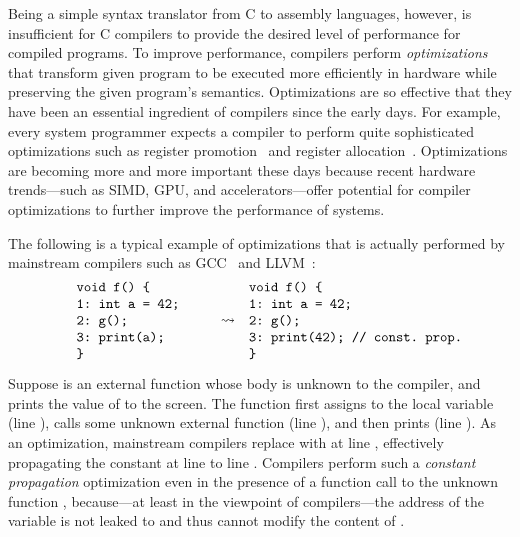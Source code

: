 

Being a simple syntax translator from C to assembly languages, however, is insufficient for C
compilers to provide the desired level of performance for compiled programs.  To improve
performance, compilers perform \emph{optimizations} that transform given program to be executed more
efficiently in hardware while preserving the given program's semantics.  Optimizations are so
effective that they have been an essential ingredient of compilers since the early days.  For
example, every system programmer expects a compiler to perform quite sophisticated optimizations
such as register promotion~\cite{mem2reg} and register allocation~\cite{regalloc}.  Optimizations
are becoming more and more important these days because recent hardware trends---such as SIMD, GPU,
and accelerators---offer potential for compiler optimizations to further improve the performance of
systems.

The following is a typical example of optimizations that is actually performed by mainstream
compilers such as GCC~\cite{gcc} and LLVM~\cite{llvm}:
%
\[\begin{array}{rcl}
\begin{minipage}{0.27\textwidth}
\begin{verbatim}
void f() {
1: int a = 42;
2: g();
3: print(a);
}
\end{verbatim}
\end{minipage}
&
\optarrow
&
\begin{minipage}{0.4\textwidth}
\begin{verbatim}
void f() {
1: int a = 42;
2: g();
3: print(42); // const. prop.
}
\end{verbatim}
\end{minipage}
\end{array}\]

\noindent Suppose  is an external function whose body is unknown to the compiler, and
 prints the value of  to the screen.  The function  first assigns
 to the local variable  (line ), calls some unknown external function
 (line ), and then prints  (line ).  As an optimization,
mainstream compilers replace  with  at line , effectively propagating the
constant  at line  to line .  Compilers perform such a \emph{constant
  propagation} optimization even in the presence of a function call to the unknown function
, because---at least in the viewpoint of compilers---the address of the variable 
is not leaked to  and thus  cannot modify the content of .


